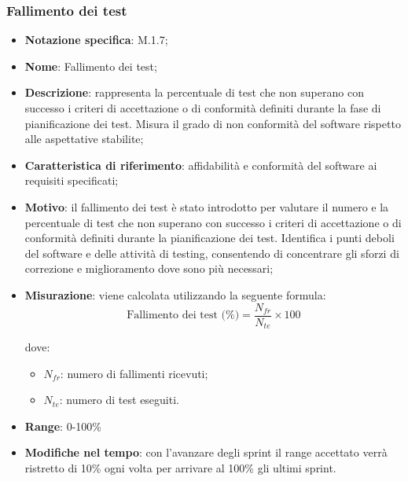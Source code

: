 \subsubsection{Fallimento dei test}
\begin{itemize}
    \item \textbf{Notazione specifica}: M.1.7;
    \item \textbf{Nome}: Fallimento dei test;
    \item \textbf{Descrizione}: rappresenta la percentuale di test che non superano con successo i criteri di accettazione o di conformità definiti durante la fase di pianificazione dei test. Misura il grado di non conformità del software rispetto alle aspettative stabilite;
    \item \textbf{Caratteristica di riferimento}: affidabilità e conformità del software ai requisiti specificati;
    \item \textbf{Motivo}: il fallimento dei test è stato introdotto per valutare il numero e la percentuale di test che non superano con successo i criteri di accettazione o di conformità definiti durante la pianificazione dei test. Identifica i punti deboli del software e delle attività di testing, consentendo di concentrare gli sforzi di correzione e miglioramento dove sono più necessari;
    \item \textbf{Misurazione}: viene calcolata utilizzando la seguente formula:
    \[
    \text{Fallimento dei test (\%)} = \frac{N_{fr}}{N_{te}} \times 100
    \]
    
    dove:
    \begin{itemize}
        \item $N_{fr}$: numero di fallimenti ricevuti;
        \item $N_{te}$: numero di test eseguiti.
    \end{itemize}
    \item \textbf{Range}: 0-100\%
    \item \textbf{Modifiche nel tempo}: con l’avanzare degli sprint il range accettato verrà ristretto di 10\% ogni volta per arrivare al 100\% gli ultimi sprint.
\end{itemize}